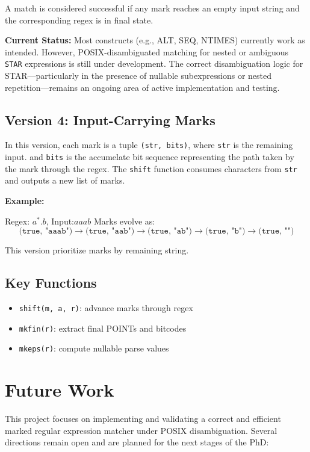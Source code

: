 \documentclass[11pt]{article}
\begin{document}
A match is considered successful if any mark reaches an empty input string and the corresponding regex is in final state.

\textbf{Current Status:}
Most constructs (e.g., ALT, SEQ, NTIMES) currently work as intended. However, POSIX-disambiguated matching for nested or ambiguous \texttt{STAR} expressions is still under development. The correct disambiguation logic for STAR—particularly in the presence of nullable subexpressions or nested repetition—remains an ongoing area of active implementation and testing.


\subsection*{Version 4: Input-Carrying Marks}
In this version, each mark is a tuple \texttt{(str, bits)}, where \texttt{str} is the remaining input. and \texttt{bits} is the accumelate bit sequence representing the path taken by the mark through the regex. The \texttt{shift} function consumes characters from \texttt{str} and outputs a new list of marks.

\textbf{Example:}

Regex: $a^* . b$, Input:$aaab$
Marks evolve as:
  \[
  \texttt{(true, "aaab")} \rightarrow
  \texttt{(true, "aab")} \rightarrow
  \texttt{(true, "ab")} \rightarrow
  \texttt{(true, "b")} \rightarrow
  \texttt{(true, "")}
  \]

This version prioritize marks by remaining string. 

\subsection*{Key Functions}
\begin{itemize}
\item \texttt{shift(m, a, r)}: advance marks through regex
\item \texttt{mkfin(r)}: extract final POINTs and bitcodes
\item \texttt{mkeps(r)}: compute nullable parse values
\end{itemize}

\section{Future Work}
This project focuses on implementing and validating a correct and efficient marked regular expression matcher under POSIX disambiguation. Several directions remain open and are planned for the next stages of the PhD:
\end{document}
